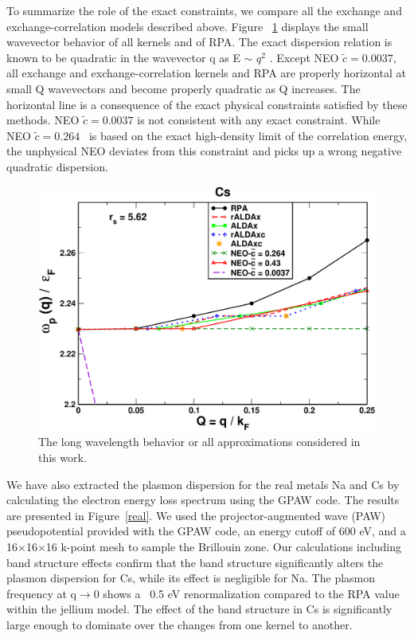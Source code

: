 \documentclass[aps,amsmath,amssymb, preprint, 12pt]{revtex4-1}
\begin{document}
To summarize the role of the exact constraints, we compare all the exchange and exchange-correlation models described above. Figure ~\ref{fig4} displays the small wavevector behavior of all kernels and of RPA. The exact dispersion relation is known to be quadratic in the wavevector q as E $ \sim $   \( q^{2} \) . Except NEO  \( \widetilde{c}=0.0037, \)  all exchange and exchange-correlation kernels and RPA are properly horizontal at small Q wavevectors and become properly quadratic as Q increases. The horizontal line is a consequence of the exact physical constraints satisfied by these methods. NEO  \( \widetilde{c}=0.0037 \)  is not consistent with any exact constraint. While NEO  \( \widetilde{c}=0.264 \) \ is based on the exact high-density limit of the correlation energy, the unphysical NEO deviates from this constraint and picks up a wrong negative quadratic dispersion. \\

\begin{figure}[h!]	
	\centering
	\includegraphics[scale=0.4]{figure_5.pdf}
	\caption{The long wavelength behavior or all approximations considered in this work.}
	\label{fig4}
\end{figure}



We have also extracted the plasmon dispersion for the real metals Na and Cs by calculating the electron energy loss spectrum using the GPAW\cite{gpaw1, gpaw2, gpaw_response, ase} code. The results are presented in Figure~\ref{real}. We used the projector-augmented wave (PAW)\cite{B94} pseudopotential provided with the GPAW code, an energy cutoff of 600 eV, and a 16$\times$16$\times$16 k-point mesh to sample the Brillouin zone. Our calculations including band structure effects confirm that the band structure significantly alters the plasmon dispersion for Cs, while its effect is negligible for Na. The plasmon frequency at q$\rightarrow$0 shows a ~0.5 eV renormalization compared to the RPA value within the jellium model. The effect of the band structure in Cs is significantly large enough to dominate over the changes from one kernel to another.
\end{document}
